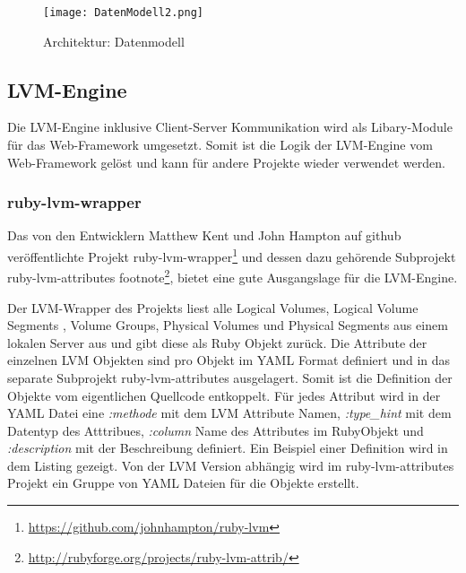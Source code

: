 \begin{figure}
\centering
\texttt{[image: DatenModell2.png]}
\caption{Architektur: Datenmodell}
\label{fig:Datenmodell}
\end{figure}

\newpage
\subsection{LVM-Engine}
Die LVM-Engine inklusive Client-Server Kommunikation wird als Libary-Module für das Web-Framework umgesetzt. Somit ist die Logik der LVM-Engine vom Web-Framework gelöst und kann für andere Projekte wieder verwendet werden. 

\subsubsection{ruby-lvm-wrapper}

Das von den Entwicklern Matthew Kent und John Hampton  auf github veröffentlichte Projekt ruby-lvm-wrapper\footnote{\href{https://github.com/johnhampton/ruby-lvm}{https://github.com/johnhampton/ruby-lvm}} und dessen dazu gehörende Subprojekt ruby-lvm-attributes footnote\footnote{\href{http://rubyforge.org/projects/ruby-lvm-attrib/}{http://rubyforge.org/projects/ruby-lvm-attrib/}}, bietet eine gute Ausgangslage für die LVM-Engine.

Der LVM-\gls{Wrapper} des Projekts liest alle Logical Volumes, Logical Volume Segments , Volume Groups, Physical Volumes und Physical Segments aus einem lokalen Server aus und gibt diese als Ruby Objekt  zurück. Die Attribute der einzelnen LVM Objekten sind pro Objekt im \gls{YAML} Format definiert und in das separate Subprojekt ruby-lvm-attributes ausgelagert. Somit ist die Definition der Objekte vom eigentlichen Quellcode entkoppelt. Für jedes Attribut wird in der \gls{YAML} Datei eine \textit{\/:methode} mit dem LVM Attribute Namen, \textit{\/:type\_hint} mit dem Datentyp des Atttribues, \textit{\/:column} Name des Attributes im RubyObjekt und \textit{\/:description} mit der Beschreibung definiert. Ein Beispiel einer Definition wird in dem Listing  gezeigt. 
Von der LVM Version abhängig wird im ruby-lvm-attributes Projekt ein Gruppe von YAML Dateien für die Objekte erstellt.

\lstset{language=Ruby, basicstyle=\footnotesize, showstringspaces=false, tabsize=2}


